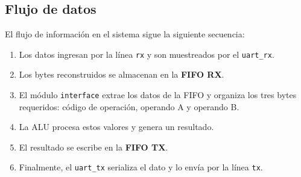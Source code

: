 \subsection{Flujo de datos}
El flujo de información en el sistema sigue la siguiente secuencia:
\begin{enumerate}
    \item Los datos ingresan por la línea \texttt{rx} y son muestreados por el \texttt{uart\_rx}.
    \item Los bytes reconstruidos se almacenan en la \textbf{FIFO RX}.
    \item El módulo \texttt{interface} extrae los datos de la FIFO y organiza los tres bytes requeridos: código de operación, operando A y operando B.
    \item La ALU procesa estos valores y genera un resultado.
    \item El resultado se escribe en la \textbf{FIFO TX}.
    \item Finalmente, el \texttt{uart\_tx} serializa el dato y lo envía por la línea \texttt{tx}.
\end{enumerate}
